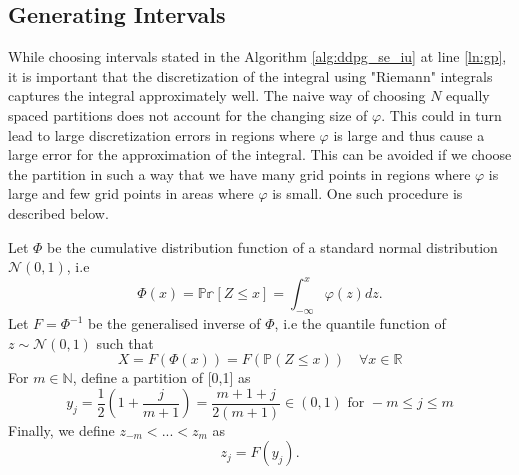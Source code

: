 \subsection{Generating Intervals}
While choosing intervals stated in the Algorithm \ref{alg:ddpg_se_iu} at line \ref{ln:gp}, it is important that the discretization of the integral using "Riemann" integrals \cite{riemann1887} captures the integral approximately well. The naive way of choosing $N$ equally spaced partitions does not account for the changing size of $\varphi.$ This could in turn lead to large discretization errors in regions where $\varphi$ is large and thus cause a large error for the approximation of the integral. This can be avoided if we choose the partition in such a way that we have many grid points in regions where $\varphi$ is large and few grid points in areas where $\varphi$ is small. One such procedure is described below.

Let $\Phi$ be the cumulative distribution function of a standard normal distribution $\mathcal{N}(0,1)$, i.e
\begin{equation}
\Phi(x) = \mathbb{Pr}[Z\leq x] = \int_{-\infty}^x\varphi(z)dz.
\end{equation}
Let $F=\Phi^{-1}$ be the generalised inverse of $\Phi$, i.e the quantile function of $z  \sim \mathcal{N}(0,1)$ such that 
\begin{equation}
    X= F(\Phi(x)) = F(\mathbb{P}(Z \leq x)) \quad \forall x \in \mathbb{ R}
\end{equation}
For $m\in\mathbb{N}$, define a partition of [0,1] as
\begin{equation}
    y_j = \frac{1}{2} (1+\frac{j}{m+1}) = \frac{m+1+j}{2(m+1)} \in (0,1) \text{ for } -m \leq j \leq m
\end{equation}
Finally, we define $z_{-m}<...<z_m$ as 
\begin{equation}
    z_j = F(y_j).
\end{equation}















